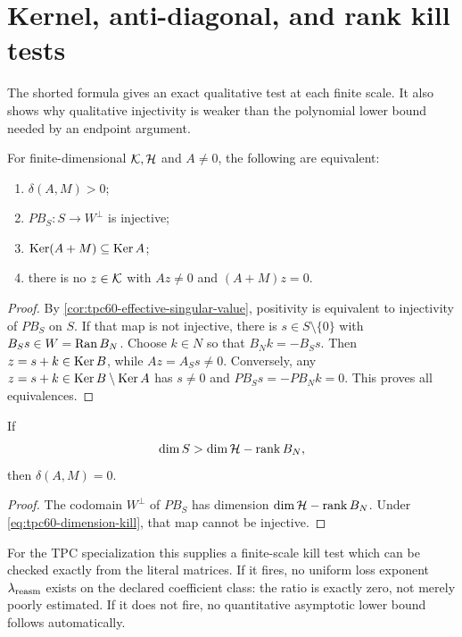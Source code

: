 \section{Kernel, anti-diagonal, and rank kill tests}
\label{sec:tpc60-kernel-tests}

The shorted formula gives an exact qualitative test at each finite scale.
It also shows why qualitative injectivity is weaker than the polynomial
lower bound needed by an endpoint argument.

\begin{theorem}
\label{thm:tpc60-exact-positivity-test}
For finite-dimensional \(\mathcal K,\mathcal H\) and \(A\ne0\), the following are
equivalent:
\begin{enumerate}[label=\textup{\(\roman*\)},leftmargin=2.6em]
 \item \(\delta(A,M)>0\);
 \item \(PB_S:S\to W^\perp\) is injective;
 \item \(\operatorname{Ker}(A+M)\subseteq\operatorname{Ker} A\);
 \item there is no \(z\in\mathcal K\) with \(Az\ne0\) and
       \((A+M)z=0\).
\end{enumerate}
\end{theorem}

\begin{proof}
By \cref{cor:tpc60-effective-singular-value}, positivity is equivalent to
injectivity of \(PB_S\) on \(S\).  If that map is not injective, there is
\(s\in S\setminus\{0\}\) with \(B_Ss\in W=\operatorname{Ran} B_N\).  Choose \(k\in N\)
so that \(B_Nk=-B_Ss\).  Then \(z=s+k\in\operatorname{Ker} B\), while
\(Az=A_Ss\ne0\).  Conversely, any \(z=s+k\in\operatorname{Ker} B\setminus\operatorname{Ker} A\)
has \(s\ne0\) and \(PB_Ss=-PB_Nk=0\).  This proves all equivalences.
\end{proof}

\begin{corollary}
\label{cor:tpc60-dimension-kill}
If
\begin{equation}
 \dim S>\dim\mathcal H-\operatorname{rank} B_N,
 \label{eq:tpc60-dimension-kill}
\end{equation}
then \(\delta(A,M)=0\).
\end{corollary}

\begin{proof}
The codomain \(W^\perp\) of \(PB_S\) has dimension
\(\dim\mathcal H-\operatorname{rank} B_N\).  Under \eqref{eq:tpc60-dimension-kill}, that map
cannot be injective.
\end{proof}

For the TPC specialization this supplies a finite-scale kill test which can
be checked exactly from the literal matrices.  If it fires, no uniform
loss exponent \(\lambda_{\rm reasm}\) exists on the declared coefficient
class: the ratio is exactly zero, not merely poorly estimated.  If it does
not fire, no quantitative asymptotic lower bound follows automatically.

